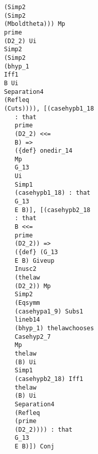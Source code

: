 \documentclass[12pt]{article}
\begin{document}
\begin{verbatim}
                                     (Simp2 
                                     (Simp2 
                                     (Mboldtheta))) Mp 
                                     prime 
                                     (D2_2) Ui 
                                     Simp2 
                                     (Simp2 
                                     (bhyp_1 
                                     Iff1 
                                     B Ui 
                                     Separation4 
                                     (Refleq 
                                     (Cuts)))), [(casehypb1_18 
                                        : that 
                                        prime 
                                        (D2_2) <<= 
                                        B) => 
                                        ({def} onedir_14 
                                        Mp 
                                        G_13 
                                        Ui 
                                        Simp1 
                                        (casehypb1_18) : that 
                                        G_13 
                                        E B)], [(casehypb2_18 
                                        : that 
                                        B <<= 
                                        prime 
                                        (D2_2)) => 
                                        ({def} (G_13 
                                        E B) Giveup 
                                        Inusc2 
                                        (thelaw 
                                        (D2_2)) Mp 
                                        Simp2 
                                        (Eqsymm 
                                        (casehypa1_9) Subs1 
                                        lineb14 
                                        (bhyp_1) thelawchooses 
                                        Casehyp2_7 
                                        Mp 
                                        thelaw 
                                        (B) Ui 
                                        Simp1 
                                        (casehypb2_18) Iff1 
                                        thelaw 
                                        (B) Ui 
                                        Separation4 
                                        (Refleq 
                                        (prime 
                                        (D2_2)))) : that 
                                        G_13 
                                        E B)]) Conj 

\end{verbatim}
\end{document}
